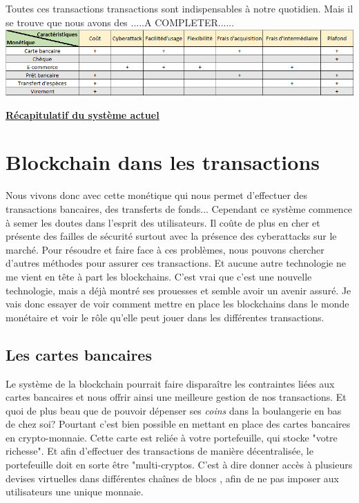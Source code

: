 \documentclass[12pt]{report}
\begin{document}
\hspace{1cm} Toutes ces transactions transactions sont indispensables à notre quotidien. Mais il se trouve que nous avons des .....A COMPLETER......\\

\includegraphics[width=1\textwidth]{tableau_recap}
\begin{center}
   \textbf{\underline{Récapitulatif du système actuel}} \\[1cm]
\end{center}


\newpage
\section{Blockchain dans les transactions}

\hspace{1cm} Nous vivons donc avec cette monétique qui nous permet d'effectuer des transactions bancaires, des transferts de fonds... Cependant ce système commence à semer les doutes dans l'esprit des utilisateurs. Il coûte de plus en cher et présente des failles de sécurité surtout avec la présence des cyberattacks sur le marché. Pour résoudre et faire face à ces problèmes, nous pouvons chercher d'autres méthodes pour assurer ces transactions. Et aucune autre technologie ne me vient en tête à part les blockchains. C'est vrai que c'est une nouvelle technologie, mais a déjà montré ses prouesses et semble avoir un avenir assuré. Je vais donc essayer de voir comment mettre en place les blockchains dans le monde monétaire et voir le rôle qu'elle peut jouer dans les différentes transactions.


    \subsection{Les cartes bancaires}

\hspace{1cm} Le système de la blockchain pourrait faire disparaître les contraintes liées aux cartes bancaires et nous offrir ainsi une meilleure gestion de nos transactions. Et quoi de plus beau que de pouvoir dépenser ses \textit{coins} dans la boulangerie en bas de chez soi? Pourtant c'est bien possible en mettant en place des cartes bancaires en crypto-monnaie. Cette carte est reliée à votre portefeuille, qui stocke "votre richesse". Et afin d'effectuer des transactions de manière décentralisée, le portefeuille doit en sorte être "multi-cryptos. C'est à dire donner accès à plusieurs devises virtuelles dans différentes chaînes de blocs , afin de ne pas imposer aux utilisateurs une unique monnaie. \\
\end{document}

